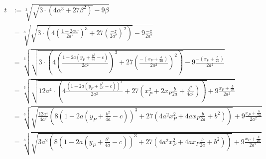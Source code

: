 \begin{align}
    t &:= \sqrt[3]{\sqrt{3 \cdot (4 \alpha^3 + 27 \beta^2)} -9\beta}\\
    &= \sqrt[3]{\sqrt{3 \cdot \left (4 \left (\frac{1- 2 aw}{2 a^2} \right )^3 + 27 \left (\frac{-z}{2 a^2} \right )^2 \right )} -9 \frac{-z}{2 a^2}}\\
    &= \sqrt[3]{\sqrt{3 \cdot \left (4 \left (\frac{1- 2 a (y_P+\frac{b^2}{4a}-c)}{2 a^2} \right )^3 + 27 \left (\frac{-(x_P+\frac{b}{2a})}{2 a^2} \right )^2 \right )} 
    -9 \frac{-(x_P+\frac{b}{2a})}{2 a^2}}\\
    &= \sqrt[3]{\sqrt{12a^4 \cdot \left (4 \frac{\left ( 1- 2 a (y_P+\frac{b^2}{4a}-c) \right )^3}{2 a^2}  + 27 \left (x_P^2+2 x_P \frac{b}{2a} + \frac{b^2}{4a^2} \right )\right )}
    + 9 \frac{x_P+\frac{b}{2a}}{2 a^2}}\\
    &= \sqrt[3]{\sqrt{\frac{12a^4}{4a^2} \left (8 \left ( 1- 2 a (y_P+\frac{b^2}{4a}-c) \right )^3  + 27 (4 a^2 x_P^2+4a x_P \frac{b}{2a} + b^2 )\right )}
    + 9 \frac{x_P+\frac{b}{2a}}{2 a^2}}\\
    &= \sqrt[3]{\sqrt{3a^2 \left (8 \left ( 1- 2 a (y_P+\frac{b^2}{4a}-c) \right )^3  + 27 (4 a^2 x_P^2+4a x_P \frac{b}{2a} + b^2 )\right )}
    + 9 \frac{x_P+\frac{b}{2a}}{2 a^2}}
\end{align}

